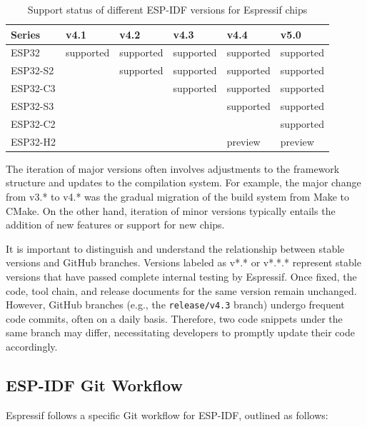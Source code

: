 \documentclass[a4paper,12pt,openany]{book}
\renewcommand{\arraystretch}{1}
\begin{document}
\begin{table}[h!]
    \renewcommand{\arraystretch}{1.5}
    \caption{Support status of different ESP-IDF versions for Espressif chips}
    \begin{tabular}{|>{\Centering}m{5.5em}|>{\Centering}m{6.3em}|>{\Centering}m{6.3em}|>{\Centering}m{6.3em}|>{\Centering}m{6.3em}|>{\Centering}m{6.3em}|}
        \hline
        \rowcolor{LightBlue} \textbf{Series}&\textbf{v4.1}&\textbf{v4.2}&\textbf{v4.3}&\textbf{v4.4}&\textbf{v5.0}\\
        \hline
        ESP32&supported&supported&supported&supported&supported\\
        \hline
        ESP32-S2&&supported&supported&supported&supported\\
        \hline
        ESP32-C3&&&supported&supported&supported\\
        \hline
        ESP32-S3&&&&supported&supported\\
        \hline
        ESP32-C2&&&&&supported\\
        \hline
        ESP32-H2&&&&preview&preview\\
        \hline
    \end{tabular}
\end{table}

The iteration of major versions often involves adjustments to the framework structure and updates to the compilation system. For example, the major change from v3.* to v4.* was the gradual migration of the build system from Make to CMake. On the other hand, iteration of minor versions typically entails the addition of new features or support for new chips.

It is important to distinguish and understand the relationship between stable versions and GitHub branches. Versions labeled as v*.* or v*.*.* represent stable versions that have passed complete internal testing by Espressif. Once fixed, the code, tool chain, and release documents for the same version remain unchanged. However, GitHub branches (e.g., the \verb|release/v4.3| branch) undergo frequent code commits, often on a daily basis. Therefore, two code snippets under the same branch may differ, necessitating developers to promptly update their code accordingly.

\subsection{ESP-IDF Git Workflow}

Espressif follows a specific Git workflow for ESP-IDF, outlined as follows:
\end{document}
